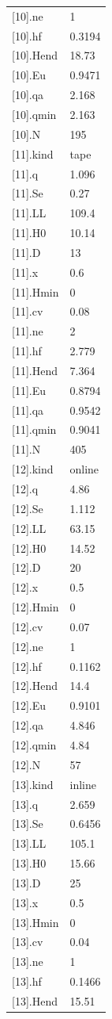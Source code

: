 {\begin{longtable}{p{}p{}}
{}[10].ne & 1\\
{}[10].hf & 0.3194\\
{}[10].Hend & 18.73\\
{}[10].Eu & 0.9471\\
{}[10].qa & 2.168\\
{}[10].qmin & 2.163\\
{}[10].N & 195\\
{}[11].kind & tape\\
{}[11].q & 1.096\\
{}[11].Se & 0.27\\
{}[11].LL & 109.4\\
{}[11].H0 & 10.14\\
{}[11].D & 13\\
{}[11].x & 0.6\\
{}[11].Hmin & 0\\
{}[11].cv & 0.08\\
{}[11].ne & 2\\
{}[11].hf & 2.779\\
{}[11].Hend & 7.364\\
{}[11].Eu & 0.8794\\
{}[11].qa & 0.9542\\
{}[11].qmin & 0.9041\\
{}[11].N & 405\\
{}[12].kind & online\\
{}[12].q & 4.86\\
{}[12].Se & 1.112\\
{}[12].LL & 63.15\\
{}[12].H0 & 14.52\\
{}[12].D & 20\\
{}[12].x & 0.5\\
{}[12].Hmin & 0\\
{}[12].cv & 0.07\\
{}[12].ne & 1\\
{}[12].hf & 0.1162\\
{}[12].Hend & 14.4\\
{}[12].Eu & 0.9101\\
{}[12].qa & 4.846\\
{}[12].qmin & 4.84\\
{}[12].N & 57\\
{}[13].kind & inline\\
{}[13].q & 2.659\\
{}[13].Se & 0.6456\\
{}[13].LL & 105.1\\
{}[13].H0 & 15.66\\
{}[13].D & 25\\
{}[13].x & 0.5\\
{}[13].Hmin & 0\\
{}[13].cv & 0.04\\
{}[13].ne & 1\\
{}[13].hf & 0.1466\\
{}[13].Hend & 15.51\\
\bottomrule\end{longtable}}

